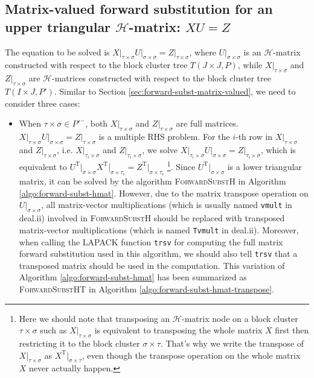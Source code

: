 \documentclass[11pt, a4paper]{book}
\begin{document}
\subsection{Matrix-valued forward substitution for an upper triangular $\mathcal{H}$-matrix: $XU = Z$}

The equation to be solved is
$X \big\vert_{\tau\times\sigma} U \big\vert_{\sigma\times\sigma} = Z
\big\vert_{\tau\times\sigma}$, where $U \big\vert_{\sigma\times\sigma}$ is an
$\mathcal{H}$-matrix constructed with respect to the block cluster tree $T(J\times J, P)$,
while $X \big\vert_{\tau\times\sigma}$ and $Z \big\vert_{\tau\times\sigma}$ are
$\mathcal{H}$-matrices constructed with respect to the block cluster tree
$T(I\times J, P')$. Similar to Section \ref{sec:forward-subst-matrix-valued}, we need to
consider three cases:
\begin{itemize}
\item When $\tau\times\sigma\in P'^-$, both $X \big\vert_{\tau\times\sigma}$ and
  $Z \big\vert_{\tau\times\sigma}$ are full matrices.
  $X \big\vert_{\tau\times\sigma} U \big\vert_{\sigma\times\sigma} = Z
  \big\vert_{\tau\times\sigma}$ is a multiple RHS problem. For the $i$-th row in
  $X \big\vert_{\tau\times\sigma}$ and $Z \big\vert_{\tau\times\sigma}$, i.e.
  $X \big\vert_{\tau_i\times\sigma}$ and $Z \big\vert_{\tau_i\times\sigma}$, we solve
  $X \big\vert_{\tau_i\times\sigma} U \big\vert_{\sigma\times\sigma} = Z
  \big\vert_{\tau_i\times\sigma}$, which is equivalent to
  $U^{\mathrm{T}} \big\vert_{\sigma\times\sigma} X^{\mathrm{T}}
  \big\vert_{\sigma\times\tau_i} = Z^{\mathrm{T}} \big\vert_{\sigma\times\tau_i}$
  \footnote{Here we should note that transposing an $\mathcal{H}$-matrix node on a block
    cluster $\tau\times\sigma$ such as $X \big\vert_{\tau\times\sigma}$ is equivalent to
    transposing the whole matrix $X$ first then restricting it to the block cluster
    $\sigma\times\tau$. That's why we write the transpose of
    $X \big\vert_{\tau\times\sigma}$ as $X^{\mathrm{T}} \big\vert_{\sigma\times\tau}$,
    even though the transpose operation on the whole matrix $X$ never actually happen.}.
  Since $U^{\mathrm{T}} \big\vert_{\sigma\times\sigma}$ is a lower triangular matrix, it
  can be solved by the algorithm \textsc{ForwardSubstH} in Algorithm
  \ref{algo:forward-subst-hmat}. However, due to the matrix transpose operation on
  $U \big\vert_{\sigma\times\sigma}$, all matrix-vector multiplications (which is usually
  named \texttt{vmult} in deal.ii) involved in \textsc{ForwardSubstH} should be replaced
  with transposed matrix-vector multiplications (which is named \texttt{Tvmult} in
  deal.ii). Moreover, when calling the LAPACK function \texttt{trsv} for computing the
  full matrix forward substitution used in this algorithm, we should also tell
  \texttt{trsv} that a transposed matrix should be used in the computation. This variation
  of Algorithm \ref{algo:forward-subst-hmat} has been summarized as
  \textsc{ForwardSubstHT} in Algorithm \ref{algo:forward-subst-hmat-transpose}.
  

\end{itemize}
\end{document}
